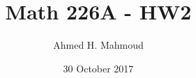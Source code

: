 \documentclass[12pt]{article}
\begin{document}
\title{Math 226A - HW2}
\author{Ahmed H. Mahmoud}
\date{30 October 2017} 

\maketitle

\newcommand{\cn}{Crank-Nicolson}




\newpage



\newpage



\newpage



\newpage






\end{document}
